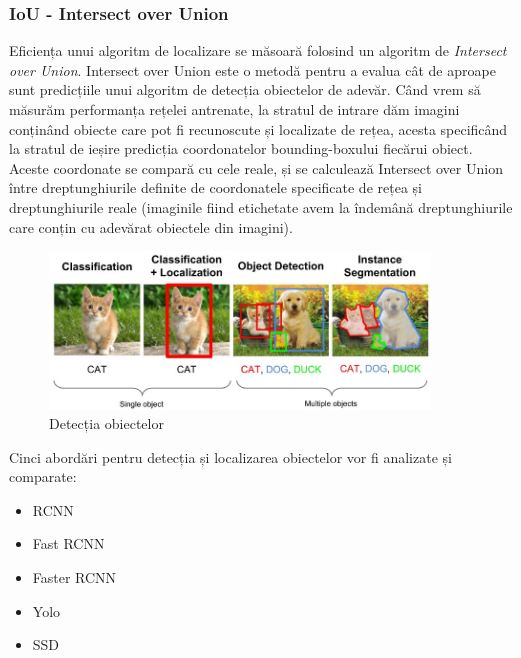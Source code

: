 \subsubsection{IoU - Intersect over Union}
Eficiența unui algoritm de localizare se măsoară folosind un algoritm de \textit{Intersect over Union}. Intersect over Union este o metodă pentru a evalua cât de aproape sunt predicțiile unui algoritm de detecția obiectelor de adevăr. \newline
Când vrem să măsurăm performanța rețelei antrenate, la stratul de intrare dăm imagini conținând obiecte care pot fi recunoscute și localizate de rețea, acesta specificând la stratul de ieșire predicția coordonatelor bounding-boxului fiecărui obiect. Aceste coordonate se compară cu cele reale, și se calculează Intersect over Union între dreptunghiurile definite de coordonatele specificate de rețea și dreptunghiurile reale (imaginile fiind etichetate avem la îndemână dreptunghiurile care conțin cu adevărat obiectele din imagini).
\begin{figure}[h!]
    	\centering
	\captionsetup{justification=centering, margin=2cm}
	\includegraphics[width=0.9\textwidth]{figures/class_detect_segment.jpeg}
	\caption{Detecția obiectelor \cite{class_detect_segment}}
	\label{fig:class_detect_segment}
\end{figure}

Cinci abordări pentru detecția și localizarea obiectelor vor fi analizate și comparate:
\begin{itemize}
	\item RCNN
	\item Fast RCNN
	\item Faster RCNN
	\item Yolo
	\item SSD
\end{itemize}

